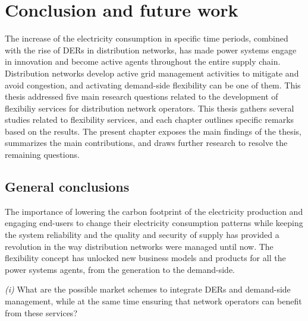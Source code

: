 
\chapter{Conclusion and future work}
\label{conclus}
	The increase of the electricity consumption in specific time periods, combined with the rise of DERs in distribution networks, has made power systems engage in innovation and become active agents throughout the entire supply chain. Distribution networks develop active grid management activities to mitigate and avoid congestion, and activating demand-side flexibility can be one of them. 
   This thesis addressed five main research questions related to the development of flexibiliy services for distribution network operators. This thesis gathers several studies related to flexibility services, and each chapter outlines specific remarks based on the results. The present chapter exposes the main findings of the thesis, summarizes the main contributions, and draws further research to resolve the remaining questions. 

\section{General conclusions}
The importance of lowering the carbon footprint of the electricity production and engaging end-users to change their electricity consumption patterns while keeping the system reliability and the quality and security of supply has provided a revolution in the way distribution networks were managed until now. The flexibility concept has unlocked new business models and products for all the power systems agents, from the generation to the demand-side.


\begin{tcolorbox}
\textit{(i)} What are the possible market schemes to integrate DERs and demand-side management, while at the same time ensuring that network operators can benefit from these services?  
\end{tcolorbox}

